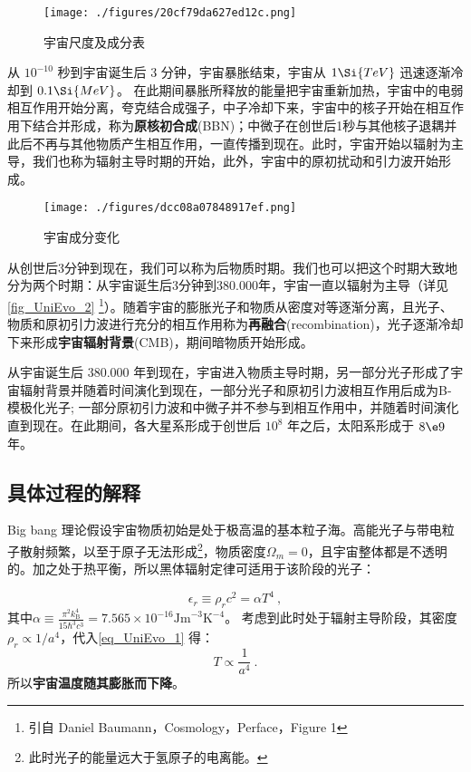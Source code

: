 \begin{figure}[ht]
\centering
\texttt{[image: ./figures/20cf79da627ed12c.png]}
\caption{宇宙尺度及成分表} \label{fig_UniEvo_1}
\end{figure}

从 $10^{-10}$ 秒到宇宙诞生后 3 分钟，宇宙暴胀结束，宇宙从 $1\Si{TeV}$ 迅速逐渐冷却到 $0.1 \Si{MeV}$。 在此期间暴胀所释放的能量把宇宙重新加热，宇宙中的电弱相互作用开始分离，夸克结合成强子，中子冷却下来，宇宙中的核子开始在相互作用下结合并形成，称为\textbf{原核初合成}(BBN)；中微子在创世后1秒与其他核子退耦并此后不再与其他物质产生相互作用，一直传播到现在。此时，宇宙开始以辐射为主导，我们也称为辐射主导时期的开始，此外，宇宙中的原初扰动和引力波开始形成。

\begin{figure}[ht]
\centering
\texttt{[image: ./figures/dcc08a07848917ef.png]}
\caption{宇宙成分变化} \label{fig_UniEvo_2}
\end{figure}

从创世后3分钟到现在，我们可以称为后物质时期。我们也可以把这个时期大致地分为两个时期：从宇宙诞生后3分钟到380.000年，宇宙一直以辐射为主导（详见\autoref{fig_UniEvo_2} \footnote{引自 Daniel Baumann，Cosmology，Perface，Figure 1}）。随着宇宙的膨胀光子和物质从密度对等逐渐分离，且光子、物质和原初引力波进行充分的相互作用称为\textbf{再融合}(recombination)，光子逐渐冷却下来形成\textbf{宇宙辐射背景}(CMB)，期间暗物质开始形成。

从宇宙诞生后 $380.000$ 年到现在，宇宙进入物质主导时期，另一部分光子形成了宇宙辐射背景并随着时间演化到现在，一部分光子和原初引力波相互作用后成为B-模极化光子; 一部分原初引力波和中微子并不参与到相互作用中，并随着时间演化直到现在。在此期间，各大星系形成于创世后 $10^8$ 年之后，太阳系形成于 $8\e9$ 年。
\subsection{具体过程的解释}
Big bang 理论假设宇宙物质初始是处于极高温的基本粒子海。高能光子与带电粒子散射频繁，以至于原子无法形成\footnote{此时光子的能量远大于氢原子的电离能。}，物质密度$\Omega_m=0$，且宇宙整体都是不透明的。加之处于热平衡，所以黑体辐射定律可适用于该阶段的光子：

\begin{equation}\label{eq_UniEvo_1}
\epsilon_r\equiv\rho_rc^2=\alpha T^4~,
\end{equation}
其中$\alpha\equiv\frac{\pi^2k_\mathrm{B}^4}{15\hbar^3c^3}=7.565\times10^{-16} \mathrm{Jm}^{-3} \mathrm{K}^{-4}$。
考虑到此时处于辐射主导阶段，其密度$\rho_r\propto 1/a^4$，代入\autoref{eq_UniEvo_1} 得：
\begin{equation}
T\propto \frac{1}{a^4}~.
\end{equation}
所以\textbf{宇宙温度随其膨胀而下降}。

